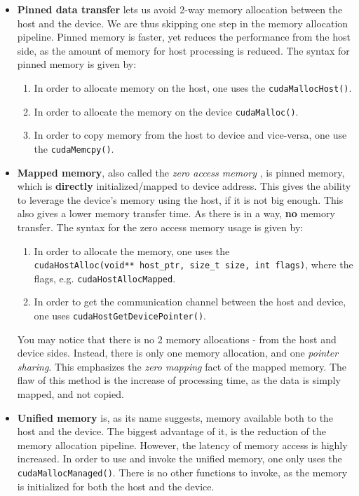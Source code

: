 {\begin{itemize}
   \item \textbf{Pinned data transfer} lets us avoid 2-way memory allocation between the host and the device. 
  We are thus skipping one step in the memory allocation pipeline.
   Pinned memory is faster, yet reduces the 
    performance from the host side, as the amount of memory 
    for host processing is reduced.
  The syntax for pinned memory is given by:
    \begin{enumerate}
      \item In order to allocate memory on the host, one uses the \verb|cudaMallocHost()|.
      \item In order to allocate the memory on the device \verb|cudaMalloc()|.
      \item In order to copy memory from the host to device and vice-versa, one use the \verb|cudaMemcpy()|.
    \end{enumerate}

   \item \textbf{Mapped memory}, also called the \textit{zero access memory}
     \cite{memory_model}, is pinned memory, which is \textbf{directly} initialized/mapped to device address. 
    This gives the ability to leverage the device's memory using the host, if it is not big enough.
    This also gives a lower memory transfer time. As there is in a way, \textbf{no} memory transfer.
    The syntax for the zero access memory usage is given by:
      \begin{enumerate}
        \item In order to allocate the memory, one uses the \\
          \verb|cudaHostAlloc(void** host_ptr, size_t size, int flags)|, where the flags, e.g. \verb|cudaHostAllocMapped|.
        \item In order to get the communication channel between the host and device, one uses 
          \verb|cudaHostGetDevicePointer()|.
      \end{enumerate}
    You may notice that there is no 2 memory allocations - from the host and device sides. Instead, 
    there is only one memory allocation, and one \textit{pointer sharing}. This emphasizes the \textit{zero mapping}
    fact of the mapped memory.
The flaw of this method is the increase of processing time, as the data is simply mapped, and not copied.

   \item \textbf{Unified memory} is, as its name suggests, memory available both to the host and the device. 
     The biggest advantage of it, is the reduction of the memory allocation pipeline. 
     However, the latency of memory access is highly increased. 
     In order to use and invoke the unified memory, one only uses the \verb|cudaMallocManaged()|. 
     There is no other functions to invoke, as the memory is initialized for both the host and the device.


\end{itemize}}

